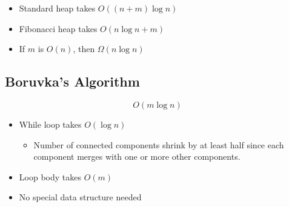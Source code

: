     \begin{itemize}
      \item Standard heap takes $ O\left( \left( n + m \right) \log n \right) $
      \item Fibonacci heap takes $ O\left( n \log n + m \right) $
      \item If $ m $ is $ O\left( n \right) $, then
      $ \Omega\left( n \log n \right) $
    \end{itemize}

  \subsection{Boruvka's Algorithm}

    \begin{equation}
      O\left( m \log n \right)
    \end{equation}

    \begin{itemize}
      \item While loop takes $ O\left( \log n \right) $
      \begin{itemize}
        \item Number of connected components shrink by at least half since
        each component merges with one or more other components.
      \end{itemize}
      \item Loop body takes $ O\left( m \right) $
      \item No special data structure needed
    \end{itemize}
